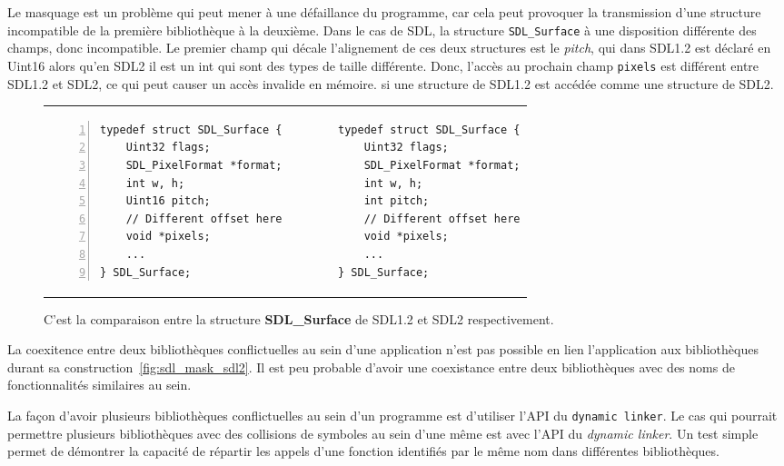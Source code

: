 Le masquage est un problème qui peut mener à une défaillance du
programme, car cela peut provoquer la transmission d'une structure incompatible
de la première bibliothèque à la deuxième. Dans le cas de SDL, la structure
\verb+SDL_Surface+ à une disposition différente des champs, donc incompatible.
Le premier champ qui décale l'alignement de ces deux structures est le
\textit{pitch}, qui dans SDL1.2 est déclaré en Uint16 alors qu'en SDL2 il est
un int qui sont des types de taille différente. Donc, l'accès au prochain champ
\texttt{pixels} est différent entre SDL1.2 et SDL2, ce qui peut causer un accès
invalide en mémoire. si une structure de SDL1.2 est accédée comme une structure
de SDL2.


\begin{figure}[h]
  \centering
\begin{tabular}{p{18em}p{18em}}
\begin{lstlisting}[frame=single,numbers=left]
typedef struct SDL_Surface {
    Uint32 flags;
    SDL_PixelFormat *format;
    int w, h;
    Uint16 pitch;
    // Different offset here
    void *pixels;
    ...
} SDL_Surface;
\end{lstlisting}&
\begin{lstlisting}[frame=single,numbers=right]
typedef struct SDL_Surface {
    Uint32 flags;
    SDL_PixelFormat *format;
    int w, h;
    int pitch;
    // Different offset here
    void *pixels;
    ...
} SDL_Surface;
\end{lstlisting}\\
\end{tabular}
  \caption{C'est la comparaison entre la structure \textbf{SDL\_Surface} de SDL1.2 et SDL2 respectivement.}
  \label{fig:sdl_surface}
\end{figure}


La coexitence entre deux bibliothèques conflictuelles au sein d'une application
n'est pas possible en lien l'application aux bibliothèques durant sa
construction~\ref{fig:sdl_mask_sdl2}.  Il est peu probable d'avoir une
coexistance entre deux bibliothèques avec des noms de fonctionnalités
similaires au sein.

La façon d'avoir plusieurs bibliothèques conflictuelles au sein d'un programme
est d'utiliser l'API du \texttt{dynamic linker}.  Le cas qui pourrait permettre
plusieurs bibliothèques avec des collisions de symboles au sein d'une même est
avec l'API du \textit{dynamic linker}. Un test simple permet de démontrer la
capacité de répartir les appels d'une fonction identifiés par le même nom dans
différentes bibliothèques.

